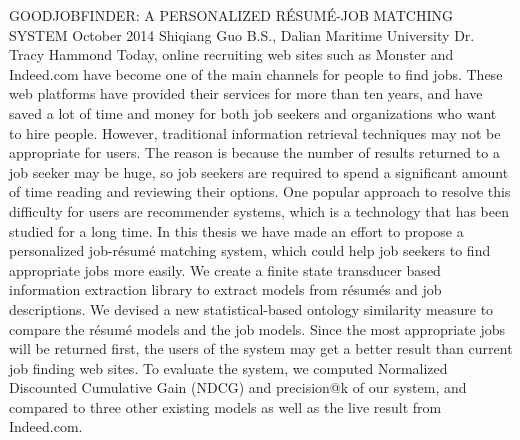 \begingroup
\absone
{GOODJOBFINDER: A PERSONALIZED R\'ESUM\'E-JOB MATCHING SYSTEM}
{October 2014}
{Shiqiang Guo}
{B.S., Dalian Maritime University}  %
{Dr. Tracy Hammond}%
{ Today, online recruiting web sites such as Monster and Indeed.com have become one of the main channels for people to find jobs. These web platforms have provided their services for more than ten years, and have saved a lot of time and money for both job seekers and organizations who want to hire people. However, traditional information retrieval techniques may not be appropriate for users. The reason is because the number of results returned to a job seeker may be huge, so job seekers are required to spend a significant amount of time reading and reviewing their options. One popular approach to resolve this difficulty for users are recommender systems, which is a technology that has been studied for a long time.
In this thesis we have made an effort to propose a personalized job-r\'esum\'e matching system, which could help job seekers to find appropriate jobs more easily. We create a finite state transducer based information extraction library to extract models from r\'esum\'es and job descriptions. We devised a new statistical-based ontology similarity measure to compare the r\'esum\'e models and the job models. Since the most appropriate jobs will be returned first, the users of the system may get a better result than current job finding web sites. To evaluate the system, we computed Normalized Discounted Cumulative Gain (NDCG) and precision@k of our system, and compared to three other existing models as well as the live result from Indeed.com.
}
\endgroup



